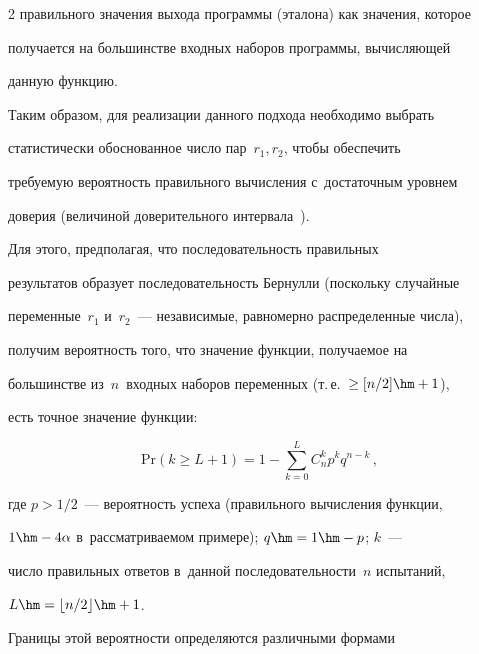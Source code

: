 \begin{multicols}{2}
правильного значения выхода программы (эталона) как значения, которое 


получается на большинстве входных наборов программы, вычисляющей 


данную функцию.


    


    Таким образом, для реализации данного подхода необходимо выбрать 


статистически обоснованное число пар~$r_1, r_2$, чтобы обеспечить 


требуемую вероятность правильного вычисления с~достаточным уровнем 


доверия (величиной доверительного интервала~\cite{13-bf}).




    Для этого, предполагая, что последовательность правильных 


результатов образует последовательность Бернулли (поскольку случайные 


переменные~$r_1$ и~$r_2$~--- независимые, равномерно распределенные числа), 


получим вероятность того, что значение функции, получаемое на 


большинстве из~$n$~входных наборов переменных (т.\,е.\ $\geq [n/2]\hm+1$), 


есть точное значение функции:





\noindent


    \begin{equation}


    \mathrm{Pr} \left( k\geq L+1\right)=1-\sum\limits^L_{k=0} C_n^k p^k 


q^{n-k}\,,


    \label{e3-bf}


    \end{equation}


где $p>1/2$~--- вероятность успеха (правильного вычисления функции, 


$1\hm- 4\alpha$ в~рассматриваемом примере); $q\hm = 1 \hm- p$; $k$~--- 


число правильных ответов в~данной последовательности~$n$ испытаний, 


$L\hm= \lfloor n/2\rfloor\hm+1$.





    Границы этой вероятности определяются различными формами 



\end{multicols}
